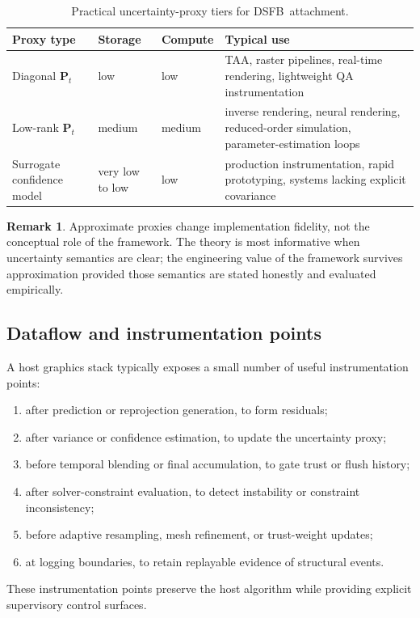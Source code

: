 \documentclass[11pt,letterpaper]{article}
\newcommand{\dsfb}{\textsc{DSFB}}
\newcommand{\covar}{\mathbf{P}}
\theoremstyle{gcresult}
\theoremstyle{definition}
\newtheorem{remark}[theorem]{Remark}
\begin{document}
\begin{table}[H]
\centering
\caption{Practical uncertainty-proxy tiers for \dsfb\ attachment.}
\label{tab:proxies}
\begin{tabularx}{\textwidth}{>{\raggedright\arraybackslash}p{} >{\centering\arraybackslash}p{} >{\centering\arraybackslash}p{} >{\raggedright\arraybackslash}X}
\toprule
\textbf{Proxy type} & \textbf{Storage} & \textbf{Compute} & \textbf{Typical use} \\
\midrule
Diagonal $\covar_t$ & low & low & TAA, raster pipelines, real-time rendering, lightweight QA instrumentation \\
Low-rank $\covar_t$ & medium & medium & inverse rendering, neural rendering, reduced-order simulation, parameter-estimation loops \\
Surrogate confidence model & very low to low & low & production instrumentation, rapid prototyping, systems lacking explicit covariance \\
\bottomrule
\end{tabularx}
\end{table}

\begin{remark}
Approximate proxies change implementation fidelity, not the conceptual role of the framework. The theory is most informative when uncertainty semantics are clear; the engineering value of the framework survives approximation provided those semantics are stated honestly and evaluated empirically.
\end{remark}

\subsection{Dataflow and instrumentation points}
A host graphics stack typically exposes a small number of useful instrumentation points:
\begin{enumerate}[leftmargin=2.2em]
    \item after prediction or reprojection generation, to form residuals;
    \item after variance or confidence estimation, to update the uncertainty proxy;
    \item before temporal blending or final accumulation, to gate trust or flush history;
    \item after solver-constraint evaluation, to detect instability or constraint inconsistency;
    \item before adaptive resampling, mesh refinement, or trust-weight updates;
    \item at logging boundaries, to retain replayable evidence of structural events.
\end{enumerate}
These instrumentation points preserve the host algorithm while providing explicit supervisory control surfaces.
\end{document}
